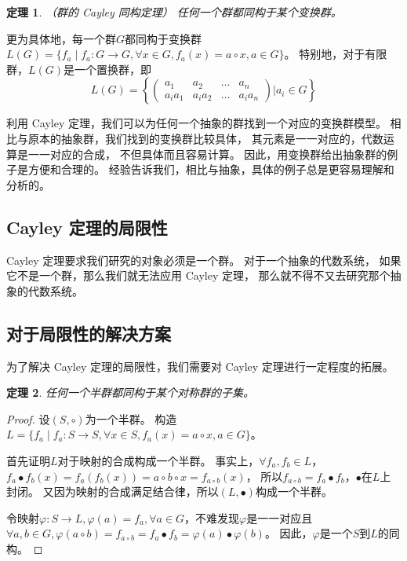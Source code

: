 \documentclass[12pt,onecolumn]{article}
\newtheorem*{proof}{证明}
\theoremstyle{plain}
\newtheorem{theorem}{定理}[section]
\begin{document}
\begin{theorem}{（群的 Cayley 同构定理）}
 任何一个群都同构于某个变换群。
\end{theorem}

更为具体地，每一个群$G$都同构于变换群$L(G) = \{ f_a \mid f_a : G \to G, \forall x \in G, f_a(x) = a \circ x, a \in G \}$。
特别地，对于有限群，$L(G)$是一个置换群，即
\[
 L(G) =
 \left\{
 \left(
 \begin{array}{cccc}
 a_1    & a_2    & \ldots & a_n    \\
 a_ia_1 & a_ia_2 & \ldots & a_ia_n
 \end{array}
 \right)
 \bigg| a_i \in G
 \right\}
\]

利用 Cayley 定理，我们可以为任何一个抽象的群找到一个对应的变换群模型。
相比与原本的抽象群，我们找到的变换群比较具体，
其元素是一一对应的，代数运算是一一对应的合成，
不但具体而且容易计算。
因此，用变换群给出抽象群的例子是方便和合理的。
经验告诉我们，相比与抽象，具体的例子总是更容易理解和分析的。

\subsection{Cayley 定理的局限性}
Cayley 定理要求我们研究的对象必须是一个群。
对于一个抽象的代数系统，
如果它不是一个群，那么我们就无法应用 Cayley 定理，
那么就不得不又去研究那个抽象的代数系统。

\subsection{对于局限性的解决方案}
为了解决 Cayley 定理的局限性，我们需要对 Cayley 定理进行一定程度的拓展。

\begin{theorem}
 任何一个半群都同构于某个对称群的子集。
\end{theorem}

\begin{proof}
 设$(S, \circ)$为一个半群。
 构造$L = \{f_a \mid f_a : S \to S, \forall x \in S, f_a(x) = a \circ x, a \in G\}$。

 首先证明$L$对于映射的合成构成一个半群。
 事实上，$\forall f_a, f_b \in L$，$f_a \bullet f_b(x) = f_a(f_b(x)) = a \circ b \circ x = f_{a \circ b} (x)$，
 所以$f_{a \circ b} = f_a \bullet f_b$，$\bullet$在$L$上封闭。
 又因为映射的合成满足结合律，所以$(L, \bullet)$构成一个半群。

 令映射$\varphi : S \to L, \varphi(a) = f_a, \forall a \in G$，不难发现$\varphi$是一一对应且
 $\forall a, b \in G, \varphi(a \circ b) = f_{a \circ b} = f_a \bullet f_b = \varphi(a) \bullet \varphi(b)$。
 因此，$\varphi$是一个$S$到$L$的同构。
\end{proof}
\end{document}
